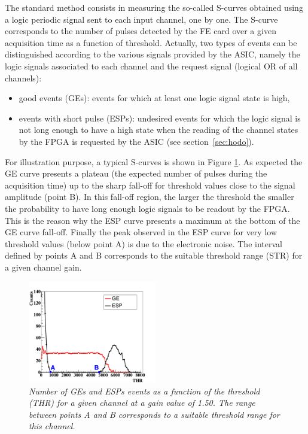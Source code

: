 \documentclass[a4paper,11pt]{article}
\begin{document}
The standard method consists in measuring the so-called S-curves obtained using a logic periodic signal sent to each input channel, one by one. The S-curve corresponds to the number of pulses detected by the FE card over a given acquisition time as a function of threshold. Actually, two types of events can be distinguished according to the various signals provided by the ASIC, namely the logic signals associated to each channel and the request signal (logical OR of all channels):
\begin{itemize}
  \item good events (GEs): events for which at least one logic signal state is high, 
  \item events with short pulse (ESPs): undesired events for which the logic signal is not long enough to have a high state when the reading of the channel states by the FPGA is requested by the ASIC (see section~\ref{sec:hodo}).
\end{itemize}

For illustration purpose, a typical S-curves is shown in Figure \ref{fig:S_Curve}. As expected the GE curve presents a plateau (the expected number of pulses during the acquisition time) up to the sharp fall-off for threshold values close to the signal amplitude (point B). In this fall-off region, the larger the threshold the smaller the probability to have long enough logic signals to be readout by the FPGA. This is the reason why the ESP curve presents a maximum at the bottom of the GE curve fall-off. Finally the peak observed in the ESP curve for very low threshold values (below point A) is due to the electronic noise. The interval defined by points A and B corresponds to the suitable threshold range (STR) for a given channel gain.

\begin{figure}[htb]
\centering
\includegraphics[width=0.5\textwidth]{figures/S_Curve_Thr_suitable_rangeAB.pdf}
\caption{\small{\textit{Number of GEs and ESPs events as a function of the threshold (THR) for a given channel at a gain value of 1.50. The range between points A and B corresponds to a suitable threshold range for this channel.}}}
\label{fig:S_Curve}
\end{figure}
\end{document}
